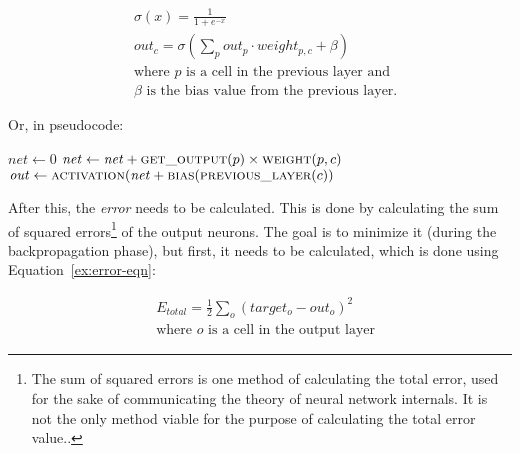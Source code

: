 \begin{multicols}{2}
\begin{Figure}
  \begin{align*}
    & \sigma(x) = \frac{1}{1+e^{-x}} \\
    & out_{c} = \sigma\left( \sum\limits_{p}
      \mathit{out_{p}} \cdot \mathit{weight_{p,c}}+\beta \right) \\
    & \text{where } p \text{ is a cell in the previous layer and } \\
    & \text{$\beta$ is the bias value from the previous layer.}
  \end{align*}
\label{eq:node-activation}
\end{Figure}

\noindent Or, in pseudocode:

\begin{Figure}
  \small
  \begin{algorithmic}
    \State${\mathit{net}}\gets 0$
    \State${\mathit{net}}\gets \mathit{net}+\textproc{get\_output}(p)\times
    \textproc{weight}(p, c)$
    \EndFor%
    \State$\mathit{out}\gets \textproc{activation}(\mathit{net}+\textproc{bias}(\textproc{previous\_layer}(c))$
    \State{}
    \EndFunction
  \end{algorithmic}
\end{Figure}

\noindent After this, the \textit{error} needs to be calculated.  This is done
by calculating the sum of squared errors\footnote{The sum of squared errors is
  one method of calculating the total error, used for the sake of communicating
  the theory of neural network internals.  It is not the only method viable for
  the purpose of calculating the total error value..} of the output neurons.
The goal is to minimize it (during the backpropagation phase), but first, it
needs to be calculated, which is done using Equation~\ref{ex:error-eqn}:

\begin{Figure}
  \begin{align*}
    & E_{total} = \frac{1}{2}\sum\limits_{o} {(\mathit{target_{o}-out_{o}})}^2 \\
    & \text{where } o \text{ is a cell in the output layer}
  \end{align*}
\label{ex:error-eqn}
\end{Figure}


\end{multicols}
